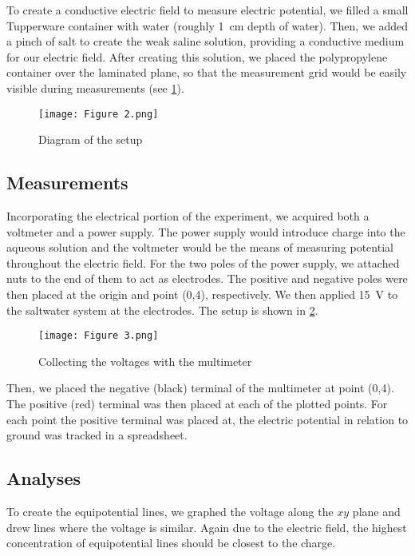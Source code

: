 \documentclass[10pt,journal,twoside]{IEEEtran}
\begin{document}
To create a conductive electric field to measure electric potential, we filled a small Tupperware container with water (roughly \qty{1}{\centi\meter} depth of water). Then, we added a pinch of salt to create the weak saline solution, providing a conductive medium for our electric field. After creating this solution, we placed the polypropylene container over the laminated plane, so that the measurement grid would be easily visible during measurements (see \cref{fig:2}). 
\begin{figure}
\begin{center}
\texttt{[image: Figure 2.png]}
\end{center}
\caption{Diagram of the setup}
\label{fig:2}    
\end{figure}

\subsection{Measurements}
Incorporating the electrical portion of the experiment, we acquired both a voltmeter and a power supply. The power supply would introduce charge into the aqueous solution and the voltmeter would be the means of measuring potential throughout the electric field. For the two poles of the power supply, we attached nuts to the end of them to act as electrodes. The positive and negative poles were then placed at the origin and point (0,4), respectively. We then applied \qty{15}{\volt} to the saltwater system at the electrodes. The setup is shown in \cref{fig:3}.
\begin{figure}
\begin{center}
\texttt{[image: Figure 3.png]}
\end{center}
\caption{Collecting the voltages with the multimeter}
\label{fig:3}
\end{figure}
Then, we placed the negative (black) terminal of the multimeter at point (0,4). The positive (red) terminal was then placed at each of the plotted points. For each point the positive terminal was placed at, the electric potential in relation to ground was tracked in a spreadsheet. 

\subsection{Analyses}
To create the equipotential lines, we graphed the voltage along the $xy$ plane and drew lines where the voltage is similar. Again due to the electric field, the highest concentration of equipotential lines should be closest to the charge.
\end{document}
